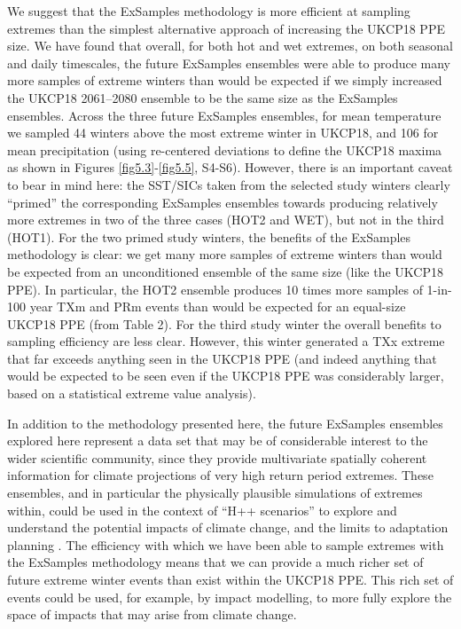   We suggest that the ExSamples methodology is more efficient at sampling extremes than the simplest alternative approach of increasing the UKCP18 PPE size. We have found that overall, for both hot and wet extremes, on both seasonal and daily timescales, the future ExSamples ensembles were able to produce many more samples of extreme winters than would be expected if we simply increased the UKCP18 2061--2080 ensemble to be the same size as the ExSamples ensembles. Across the three future ExSamples ensembles, for mean temperature we sampled 44 winters above the most extreme winter in UKCP18, and 106 for mean precipitation (using re-centered deviations to define the UKCP18 maxima as shown in Figures \ref{fig5.3}-\ref{fig5.5}, S4-S6). However, there is an important caveat to bear in mind here: the SST/SICs taken from the selected study winters clearly ``primed'' the corresponding ExSamples ensembles towards producing relatively more extremes in two of the three cases (HOT2 and WET), but not in the third (HOT1). For the two primed study winters, the benefits of the ExSamples methodology is clear: we get many more samples of extreme winters than would be expected from an unconditioned ensemble of the same size (like the UKCP18 PPE). In particular, the HOT2 ensemble produces 10 times more samples of 1-in-100 year TXm and PRm events than would be expected for an equal-size UKCP18 PPE (from Table 2). For the third study winter the overall benefits to sampling efficiency are less clear. However, this winter generated a TXx extreme that far exceeds anything seen in the UKCP18 PPE (and indeed anything that would be expected to be seen even if the UKCP18 PPE was considerably larger, based on a statistical extreme value analysis).
  
  In addition to the methodology presented here, the future ExSamples ensembles explored here represent a data set that may be of considerable interest to the wider scientific community, since they provide multivariate spatially coherent information for climate projections of very high return period extremes. These ensembles, and in particular the physically plausible simulations of extremes within, could be used in the context of ``H++ scenarios'' to explore and understand the potential impacts of climate change, and the limits to adaptation planning \citep{wade_developing_2015}. The efficiency with which we have been able to sample extremes with the ExSamples methodology means that we can provide a much richer set of future extreme winter events than exist within the UKCP18 PPE. This rich set of events could be used, for example, by impact modelling, to more fully explore the space of impacts that may arise from climate change.
  
